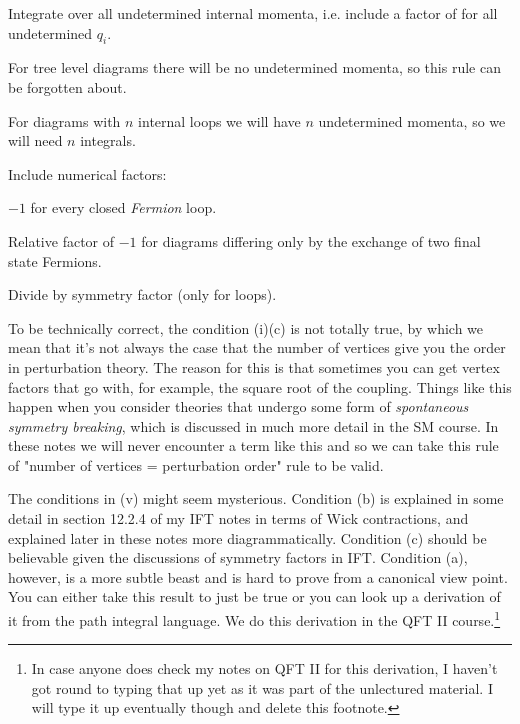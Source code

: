     \item Integrate over all undetermined internal momenta, i.e. include a factor of 
    \bse 
        \int {}
    \ese
    for all undetermined $q_i$.
        \ben 
            \item For tree level diagrams there will be no undetermined momenta, so this rule can be forgotten about. 
            \item For diagrams with $n$ internal loops we will have $n$ undetermined momenta, so we will need $n$ integrals.
        \een    
    \item Include numerical factors: 
        \ben 
            \item $-1$ for every closed \textit{Fermion} loop.
            \item Relative factor of $-1$ for diagrams differing only by the exchange of two final state Fermions. 
            \item Divide by symmetry factor (only for loops). 
        \een 
\een 

\br 
    To be technically correct, the condition (i)(c) is not totally true, by which we mean that it's not always the case that the number of vertices give you the order in perturbation theory. The reason for this is that sometimes you can get vertex factors that go with, for example, the square root of the coupling. Things like this happen when you consider theories that undergo some form of \textit{spontaneous symmetry breaking}, which is discussed in much more detail in the SM course. In these notes we will never encounter a term like this and so we can take this rule of "number of vertices = perturbation order" rule to be valid.
\er

\br 
    The conditions in (v) might seem mysterious. Condition (b) is explained in some detail in section 12.2.4 of my IFT notes in terms of Wick contractions, and explained later in these notes more diagrammatically. Condition (c) should be believable given the discussions of symmetry factors in IFT. Condition (a), however, is a more subtle beast and is hard to prove from a canonical view point. You can either take this result to just be true or you can look up a derivation of it from the path integral language. We do this derivation in the QFT II course.\footnote{In case anyone does check my notes on QFT II for this derivation, I haven't got round to typing that up yet as it was part of the unlectured material. I will type it up eventually though and delete this footnote. }
\er 